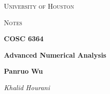 \documentclass[a4paper]{book}
\theoremstyle{definition}
\begin{document}
\begin{titlepage}
	\centering
	{\scshape\LARGE University of Houston\par}
	\vspace{1cm}
	{\scshape\Large Notes \par}
	\vspace{1.5cm}
	{\huge\bfseries COSC 6364 \par}
	{\huge\bfseries Advanced Numerical Analysis \par}
	\vspace{0.5cm}
	{\large\bfseries Panruo Wu\par}
	\vspace{1cm}
	{\Large\textit{Khalid Hourani}}
	\vspace{0.5cm}
	{\large \par} %
	\vfill
\end{titlepage}

\tableofcontents
\newpage{}




\glsaddall
\clearpage

\printglossaries
\end{document}
